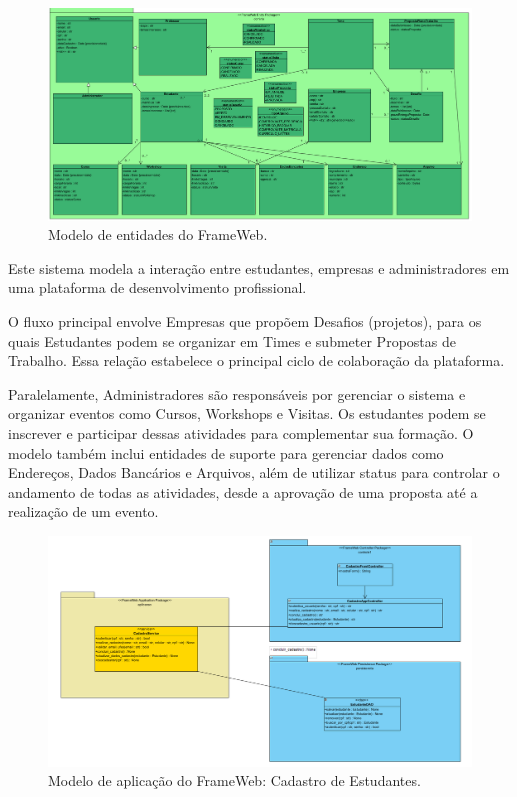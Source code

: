 \begin{figure}[H]
	\centering
	\includegraphics[width=1.0\textwidth]{figuras/figura_modelo_entidades.png}
	\caption{Modelo de entidades do FrameWeb.}
	\label{figura-entidades}
\end{figure}

Este sistema modela a interação entre estudantes, empresas e administradores em uma plataforma de desenvolvimento profissional.

O fluxo principal envolve Empresas que propõem Desafios (projetos), para os quais Estudantes podem se organizar em Times e submeter Propostas de Trabalho. Essa relação estabelece o principal ciclo de colaboração da plataforma.

Paralelamente, Administradores são responsáveis por gerenciar o sistema e organizar eventos como Cursos, Workshops e Visitas. Os estudantes podem se inscrever e participar dessas atividades para complementar sua formação. O modelo também inclui entidades de suporte para gerenciar dados como Endereços, Dados Bancários e Arquivos, além de utilizar status para controlar o andamento de todas as atividades, desde a aprovação de uma proposta até a realização de um evento.

\begin{figure}[H]
	\centering
	\includegraphics[width=1.0\textwidth]{figuras/figura_modelo_aplicacao.png}
	\caption{Modelo de aplicação do FrameWeb: Cadastro de Estudantes.}
	\label{figura-aplicacao}
\end{figure}

